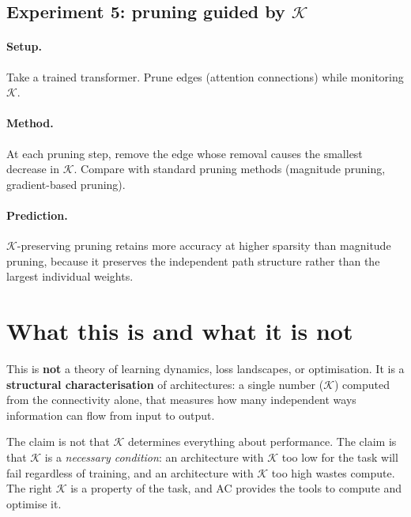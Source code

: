 \documentclass[11pt,a4paper]{article}
\newcommand{\K}{\mathcal{K}}
\begin{document}
\subsection{Experiment 5: pruning guided by $\K$}

\paragraph{Setup.}
Take a trained transformer.  Prune edges (attention connections)
while monitoring $\K$.

\paragraph{Method.}
At each pruning step, remove the edge whose removal causes the
smallest decrease in $\K$.  Compare with standard pruning methods
(magnitude pruning, gradient-based pruning).

\paragraph{Prediction.}
$\K$-preserving pruning retains more accuracy at higher sparsity
than magnitude pruning, because it preserves the independent path
structure rather than the largest individual weights.


\section{What this is and what it is not}

This is \textbf{not} a theory of learning dynamics, loss landscapes,
or optimisation.  It is a \textbf{structural characterisation} of
architectures: a single number ($\K$) computed from the connectivity
alone, that measures how many independent ways information can flow
from input to output.

The claim is not that $\K$ determines everything about performance.
The claim is that $\K$ is a \emph{necessary condition}: an
architecture with $\K$ too low for the task will fail regardless
of training, and an architecture with $\K$ too high wastes compute.
The right $\K$ is a property of the task, and AC provides the tools
to compute and optimise it.
\end{document}
